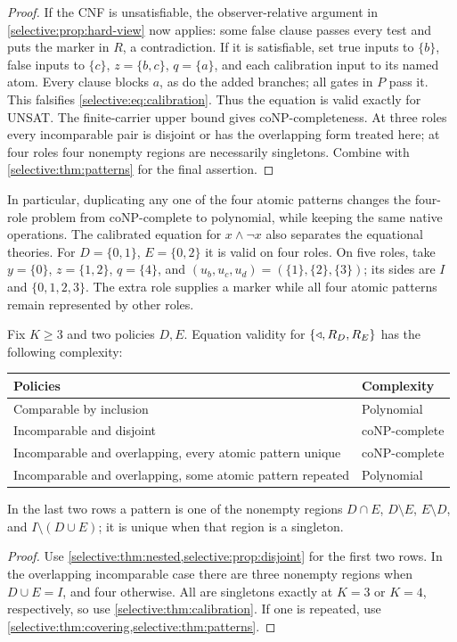 \begin{proof}
If the CNF is unsatisfiable, the observer-relative argument in
\cref{selective:prop:hard-view} now applies: some false clause passes
every test and puts the marker in $R$, a contradiction. If it is
satisfiable, set true inputs to $\{b\}$, false inputs to $\{c\}$,
$z=\{b,c\}$, $q=\{a\}$, and each calibration input to its named
atom. Every clause blocks $a$, as do the added branches; all gates
in $P$ pass it. This falsifies \eqref{selective:eq:calibration}.
Thus the equation is valid exactly for UNSAT. The finite-carrier
upper bound gives coNP-completeness. At three roles every incomparable
pair is disjoint or has the overlapping form treated here; at four
roles four nonempty regions are necessarily singletons. Combine with
\cref{selective:thm:patterns} for the final assertion.
\end{proof}

In particular, duplicating any one of the four atomic patterns changes
the four-role problem from coNP-complete to polynomial, while keeping
the same native operations. The calibrated equation for
$x\land\lnot x$ also separates the equational theories. For
$D=\{0,1\}$, $E=\{0,2\}$ it is valid on four roles. On five roles,
take $y=\{0\}$, $z=\{1,2\}$, $q=\{4\}$, and
$(u_b,u_c,u_d)=(\{1\},\{2\},\{3\})$; its sides are $I$ and
$\{0,1,2,3\}$. The extra role supplies a marker while all four
atomic patterns remain represented by other roles.

\begin{corollary}\label{selective:cor:two-policies}
Fix $K\geq3$ and two policies $D,E$. Equation validity for
$\{\mathbin{\triangleleft},R_D,R_E\}$ has the following complexity:
\begin{center}\small
\begin{tabular}{ll}
\toprule
Policies & Complexity\\
\midrule
Comparable by inclusion & Polynomial\\
Incomparable and disjoint & coNP-complete\\
Incomparable and overlapping, every atomic pattern unique & coNP-complete\\
Incomparable and overlapping, some atomic pattern repeated & Polynomial\\
\bottomrule
\end{tabular}
\end{center}
In the last two rows a pattern is one of the nonempty regions
$D\cap E$, $D\setminus E$, $E\setminus D$, and
$I\setminus(D\cup E)$; it is unique when that region is a singleton.
\end{corollary}
\begin{proof}
Use \cref{selective:thm:nested,selective:prop:disjoint} for the first
two rows. In the overlapping incomparable case there are three
nonempty regions when $D\cup E=I$, and four otherwise. All are
singletons exactly at $K=3$ or $K=4$, respectively, so use
\cref{selective:thm:calibration}. If one is repeated, use
\cref{selective:thm:covering,selective:thm:patterns}.
\end{proof}

